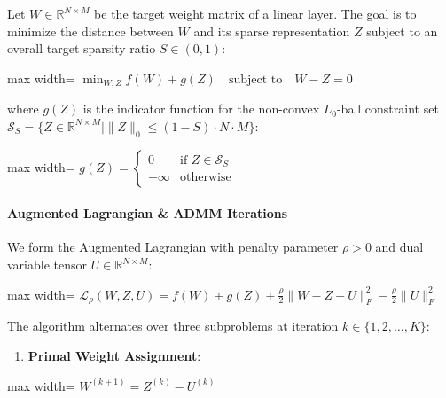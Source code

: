 Let $W \in \mathbb{R}^{N \times M}$ be the target weight matrix of a linear layer. The goal is to minimize the distance between $W$ and its sparse representation $Z$ subject to an overall target sparsity ratio $S \in (0, 1)$:

\begin{center}
\begin{adjustbox}{max width=\columnwidth}
$\displaystyle
\min_{W, Z} f(W) + g(Z) \quad \text{subject to} \quad W - Z = 0
$
\end{adjustbox}
\end{center}

where $g(Z)$ is the indicator function for the non-convex $L_0$-ball constraint set $\mathcal{S}_S = \{ Z \in \mathbb{R}^{N \times M} \mid \|Z\|_0 \le (1 - S) \cdot N \cdot M \}$:

\begin{center}
\begin{adjustbox}{max width=\columnwidth}
$\displaystyle
g(Z) = \begin{cases} 0 & \text{if } Z \in \mathcal{S}_S \\ +\infty & \text{otherwise} \end{cases}
$
\end{adjustbox}
\end{center}

\paragraph{Augmented Lagrangian \& ADMM Iterations}

We form the Augmented Lagrangian with penalty parameter $\rho > 0$ and dual variable tensor $U \in \mathbb{R}^{N \times M}$:

\begin{center}
\begin{adjustbox}{max width=\columnwidth}
$\displaystyle
\mathcal{L}_\rho(W, Z, U) = f(W) + g(Z) + \frac{\rho}{2} \| W - Z + U \|_F^2 - \frac{\rho}{2} \| U \|_F^2
$
\end{adjustbox}
\end{center}

The algorithm alternates over three subproblems at iteration $k \in \{1, 2, \dots, K\}$:

\begin{enumerate}
\item \textbf{Primal Weight Assignment}:
\end{enumerate}
\begin{center}
\begin{adjustbox}{max width=\columnwidth}
$\displaystyle
W^{(k+1)} = Z^{(k)} - U^{(k)}
$
\end{adjustbox}
\end{center}

